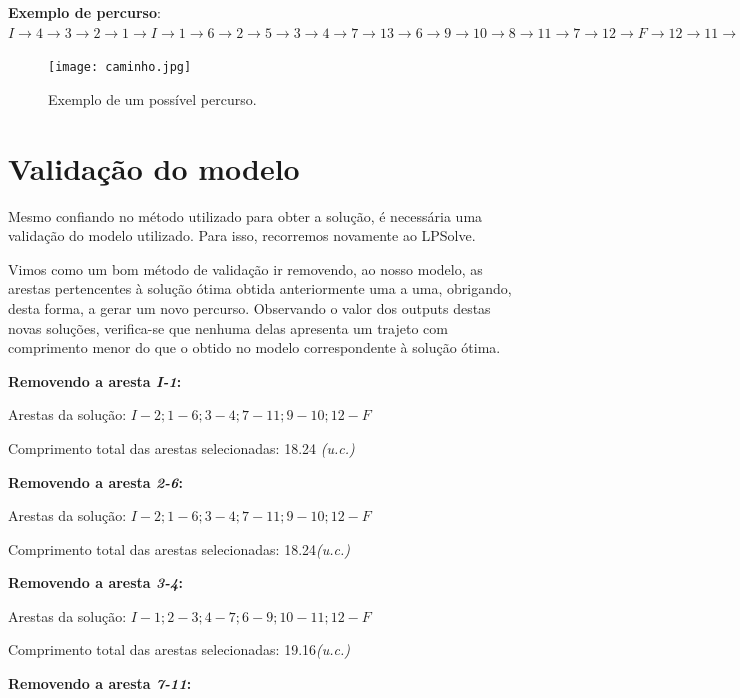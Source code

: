 \documentclass[runningheads]{llncs}
\begin{document}
\textbf{Exemplo de percurso}: 
\newline $I \rightarrow 4 \rightarrow 3 \rightarrow 2 \rightarrow 1 \rightarrow I \rightarrow 1 \rightarrow 6 \rightarrow 2 \rightarrow 5 \rightarrow 3 \rightarrow 4 \rightarrow 7 \rightarrow 13 \rightarrow 6 \rightarrow 9 \rightarrow 10 \rightarrow 8 \rightarrow 11 \rightarrow 7 \rightarrow 12 \rightarrow F \rightarrow 12 \rightarrow 11 \rightarrow 10 \rightarrow 9 \rightarrow F$

\begin{figure}[h]
\centering
\texttt{[image: caminho.jpg]}
\caption{Exemplo de um possível percurso.} 
\label{fig:data9}
\end{figure}

\clearpage

\section{Validação do modelo}
Mesmo confiando no método utilizado para obter a solução, é necessária uma validação do modelo utilizado. Para isso, recorremos novamente ao LPSolve.

Vimos como um bom método de validação ir removendo, ao nosso modelo, as arestas pertencentes à solução ótima obtida anteriormente uma a uma, obrigando, desta forma, a gerar um novo percurso. Observando o valor dos outputs destas novas soluções, verifica-se que nenhuma delas apresenta um trajeto com comprimento menor do que o obtido no modelo correspondente à solução ótima.

\bigskip
\textbf{Removendo a aresta \textit{I-1}:}

    Arestas da solução: $I-2; 1-6; 3-4; 7-11; 9-10; 12-F$
    
    Comprimento total das arestas selecionadas: 18.24 \textit{(u.c.)} 

\bigskip
\textbf{Removendo a aresta \textit{2-6}:}

    Arestas da solução: $I-2; 1-6; 3-4; 7-11; 9-10; 12-F$
    
    Comprimento total das arestas selecionadas: 18.24\textit{(u.c.)} 
    
\bigskip
\textbf{Removendo a aresta \textit{3-4}:}

    Arestas da solução: $I-1; 2-3; 4-7; 6-9; 10-11; 12-F$
    
    Comprimento total das arestas selecionadas: 19.16\textit{(u.c.)} 

\bigskip
\textbf{Removendo a aresta \textit{7-11}:}
\end{document}
